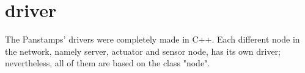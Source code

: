 \section{driver}
The Panstamps' drivers were completely made in C++. Each different node in the network, namely server, actuator and sensor node, has its own driver; nevertheless, all of them are based on the class "node". 
